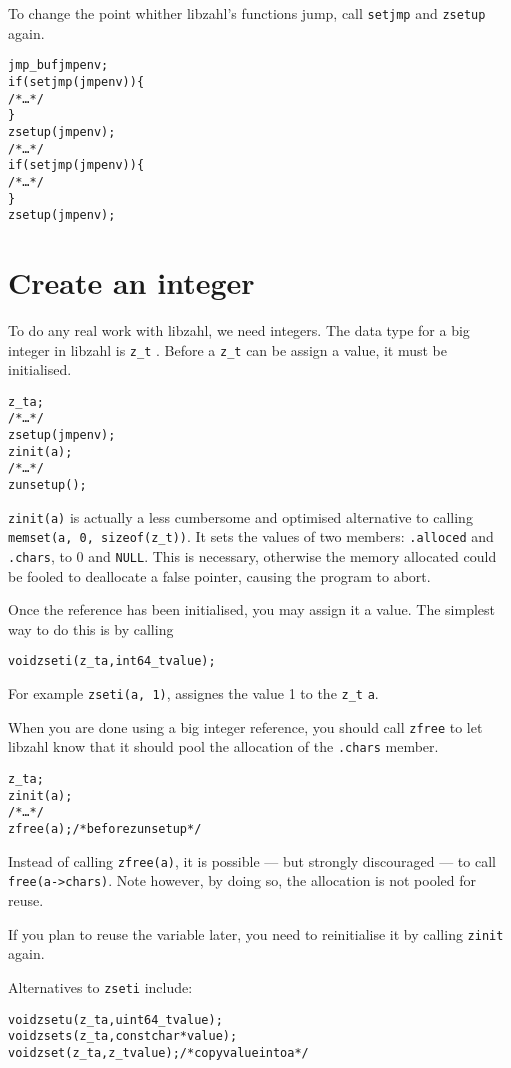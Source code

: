 To change the point whither libzahl's functions
jump, call {\tt setjmp} and {\tt zsetup} again.

\begin{alltt}
   jmp_buf jmpenv;
   if (setjmp(jmpenv)) \{
       \textcolor{c}{/* \textrm{\ldots} */}
   \}
   zsetup(jmpenv);
   \textcolor{c}{/* \textrm{\ldots} */}
   if (setjmp(jmpenv)) \{
       \textcolor{c}{/* \textrm{\ldots} */}
   \}
   zsetup(jmpenv);
\end{alltt}


\newpage
\section{Create an integer}
\label{sec:Create an integer}

To do any real work with libzahl, we need integers. The
data type for a big integer in libzahl is {\tt z\_t}
. Before a {\tt z\_t}
can be assign a value, it must be initialised.

\begin{alltt}
   z_t a;
   \textcolor{c}{/* \textrm{\ldots} */
   zsetup(jmpenv);}
   zinit(a);
   \textcolor{c}{/* \textrm{\ldots} */
   zunsetup();}
\end{alltt}

\noindent
{\tt zinit(a)} is actually a less cumbersome and optimised
alternative to calling {\tt memset(a, 0, sizeof(z\_t))}.
It sets the values of two members: {\tt .alloced} and
{\tt .chars}, to 0 and {\tt NULL}. This is necessary,
otherwise the memory allocated could be fooled to deallocate
a false pointer, causing the program to abort.

Once the reference has been initialised, you may assign it
a value. The simplest way to do this is by calling

\begin{alltt}
   void zseti(z_t a, int64_t value);
\end{alltt}

\noindent
For example {\tt zseti(a, 1)}, assignes the value 1 to
the {\tt z\_t} {\tt a}.

When you are done using a big integer reference, you should
call {\tt zfree} to let libzahl know that it should pool
the allocation of the {\tt .chars} member.

\begin{alltt}
   z_t a;
   zinit(a);
   \textcolor{c}{/* \textrm{\ldots} */}
   zfree(a); \textcolor{c}{/* \textrm{before \texttt{zunsetup}} */}
\end{alltt}

\noindent
Instead of calling {\tt zfree(a)}, it is possible — but
strongly discouraged — to call {\tt free(a->chars)}.
Note however, by doing so, the allocation is not pooled
for reuse.

If you plan to reuse the variable later, you need to
reinitialise it by calling {\tt zinit} again.

Alternatives to {\tt zseti} include:

\begin{alltt}
   void zsetu(z_t a, uint64_t value);
   void zsets(z_t a, const char *value);
   void zset(z_t a, z_t value); \textcolor{c}{/* \textrm{copy \texttt{value} into \texttt{a}} */}
\end{alltt}

